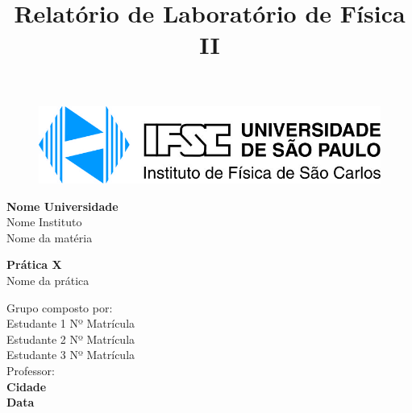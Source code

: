 \documentclass[a4paper]{article}
\begin{document}
\title{Relatório de Laboratório de Física II}

\begin{titlepage}
	\begin{center}
		\begin{figure}[htb!]
		\centering
				\includegraphics[scale=1.5]{imagens/logo.jpg}
		\end{figure}
		\vspace{20pt}
        \Large{\textbf{Nome Universidade }}\\
        \Large{Nome Instituto}\\
        \Large{Nome da matéria}\\
        
        \vspace{150pt}
        
        \LARGE{\textbf{Prática X}}\\ 
        \Large{Nome da prática}\\ %
        
        \vspace{125pt}
        
        \hfill Grupo composto por: \\
        
        \vspace{20pt} 
        \hfill Estudante 1 \hspace{20pt}Nº Matrícula\\
        \hfill Estudante 2 \hspace{20pt}Nº Matrícula\\
        \hfill Estudante 3 \hspace{20pt}Nº Matrícula\\

        \vspace{25pt}
        \hfill {Professor:}\\
        
        
        \vspace{\fill}
        \Large \bf{Cidade\\}
        \Large \bf{Data}
          
	\end{center}
\end{titlepage}
\end{document}
